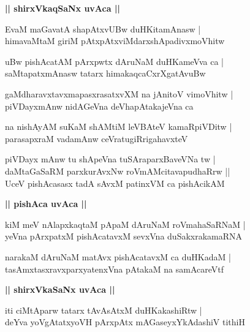 \documentclass[twoside,12pt,openright]{book}
\newcounter{shloka}[chapter]
\def\uvaca#1{\centerline{{\large\textbf{#1}}}}
\begin{document}
\uvaca{|| shirxVkaqSaNx uvAca ||}

\begin{shloka}%
EvaM maGavatA shapAtxvUBw duHKitamAnasw |\\
himavaMtaM giriM pAtxpAtxviMdarxshApadivxmoVhitw
\end{shloka}

\begin{shloka}%
uBw pishAcatAM pArxpwtx dAruNaM duHKameVva ca |\\
saMtapatxmAnasw tatarx himakaqcaCxrXgatAvuBw
\end{shloka}

\begin{shloka}%
gaMdharavxtavxmapasxrasatxvXM na jAnitoV vimoVhitw |\\
piVDayxmAnw nidAGeVna deVhapAtakajeVna ca 
\end{shloka}

\begin{shloka}%
na nishAyAM suKaM shAMtiM leVBAteV kamaRpiVDitw |\\
parasapxraM vadamAnw ceVratugiRrigahavxteV
\end{shloka}

\begin{shloka}%
piVDayx mAnw tu shApeVna tuSAraparxBaveVNa tw |\\
daMtaGaSaRM parxkurAvxNw roVmAMcitavapudhaRrw ||\\
UceV pishAcasasx tadA sAvxM patinxVM ca pishAcikAM
\end{shloka}

\uvaca{|| pishAca uvAca ||}

\begin{shloka}%
kiM meV nAlapxkaqtaM pApaM dAruNaM roVmahaSaRNaM |\\
yeVna pArxpatxM pishAcatavxM sevxVna duSakxrakamaRNA
\end{shloka}

\begin{shloka}%
narakaM dAruNaM matAvx pishAcatavxM ca duHKadaM |\\
tasAmxtasxravxparxyatenxVna pAtakaM na samAcareVtf
\end{shloka}

\uvaca{|| shirxVkaSaNx uvAca ||}

\begin{shloka}%
iti ciMtAparw tatarx tAvAsAtxM duHKakashiRtw |\\
deYva yoVgAtatxyoVH pArxpAtx mAGaseyxYkAdashiV tithiH 
\end{shloka}
\end{document}
